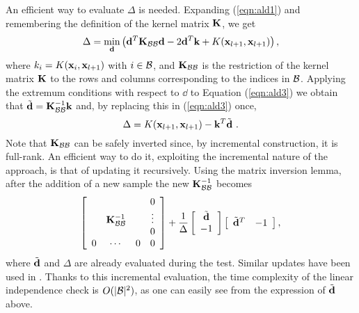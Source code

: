 An efficient way to evaluate $\Delta$ is needed. Expanding (\ref{eqn:ald1}) and
remembering the definition of the kernel matrix $\mathbf{K}$, we get
%
\begin{equation}
  \label{eqn:ald3}
  \Delta = \min_{\mathbf{d}} \left( \mathbf{d}^T \mathbf{K}_{\mathcal{B}\mathcal{B}}\mathbf{d} - 2 \mathbf{d}^T \mathbf{k} + K(\mathbf{x}_{l+1},\mathbf{x}_{l+1}) \right),
\end{equation}
%
\noindent where $k_i = K(\mathbf{x}_i,\mathbf{x}_{l+1})$ with $i \in \mathcal{B}$, and $\mathbf{K}_{\mathcal{B}\mathcal{B}}$ is the
restriction of the kernel matrix $\mathbf{K}$ to the rows and columns corresponding to the
indices in $\mathcal{B}$. Applying the extremum conditions with respect to $\dd$ to Equation
(\ref{eqn:ald3}) we obtain that $\tilde{\mathbf{d}} = \mathbf{K}_{\mathcal{B}\mathcal{B}}^{-1} \mathbf{k}$ and, by replacing
this in (\ref{eqn:ald3}) once,
%
\begin{equation}
  \label{eqn:ald5}
  \Delta = K(\mathbf{x}_{l+1},\mathbf{x}_{l+1}) - \mathbf{k}^T \tilde{\mathbf{d}}~.
\end{equation}
%
Note that $\mathbf{K}_{\mathcal{B}\mathcal{B}}$ can be safely inverted since, by incremental
construction, it is full-rank. An efficient way to do it, exploiting
the incremental nature of the approach, is that of updating it
recursively. Using the matrix inversion lemma, after the addition of a new sample the new
$\mathbf{K}_{\mathcal{B}\mathcal{B}}^{-1}$ becomes
%
\begin{equation}
  \label{eqn:inv_upd}
  \left[\begin{array}{cccc}
       &               &   & 0 \\
       & \mathbf{K}_{\mathcal{B}\mathcal{B}}^{-1} &   & \vdots \\
       &               &   & 0 \\
     0 &       \cdots  & 0 & 0
  \end{array}\right]
  +
  \frac{1}{\Delta}
  \left[\begin{array}{c}
    \tilde{\mathbf{d}} \\
    -1
  \end{array}\right]
  \left[\begin{array}{cc}
    \tilde{\mathbf{d}}^T & -1
  \end{array}\right],
\end{equation}
%
\noindent where $\tilde{\mathbf{d}}$ and $\Delta$ are already evaluated during the
test. Similar updates have been used in \cite{CauwenberghsP00,CsatoO01}. Thanks to this
incremental evaluation, the time complexity of the linear independence
check is $O(|\mathcal{B}|^2)$, as one can easily see from the expression of $\tilde{\mathbf{d}}$
above.


